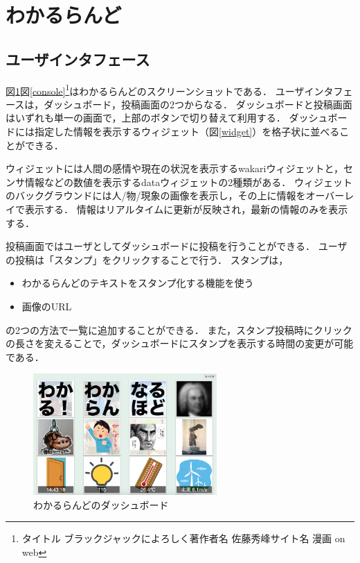 \section{わかるらんど}

\subsection{ユーザインタフェース}

図\ref{dashboard}図\ref{console}\footnote{タイトル ブラックジャックによろしく\newline 著作者名 佐藤秀峰\newline サイト名 漫画 on web}はわかるらんどのスクリーンショットである．
ユーザインタフェースは，ダッシュボード，投稿画面の2つからなる．
ダッシュボードと投稿画面はいずれも単一の画面で，上部のボタンで切り替えて利用する．
ダッシュボードには指定した情報を表示するウィジェット（図\ref{widget}）を格子状に並べることができる．

ウィジェットには人間の感情や現在の状況を表示するwakariウィジェットと，センサ情報などの数値を表示するdataウィジェットの2種類がある．
ウィジェットのバックグラウンドには人/物/現象の画像を表示し，その上に情報をオーバーレイで表示する．
情報はリアルタイムに更新が反映され，最新の情報のみを表示する．

投稿画面ではユーザとしてダッシュボードに投稿を行うことができる．
ユーザの投稿は「スタンプ」をクリックすることで行う．
スタンプは，
\begin{itemize}
\item わかるらんどのテキストをスタンプ化する機能を使う
\item 画像のURL
\end{itemize}
の2つの方法で一覧に追加することができる．
また，スタンプ投稿時にクリックの長さを変えることで，ダッシュボードにスタンプを表示する時間の変更が可能である．

\begin{figure}[h]
\centering
\includegraphics[width=7cm]{images/dashboard.png}
\caption{わかるらんどのダッシュボード}
\label{dashboard}
\end{figure}

